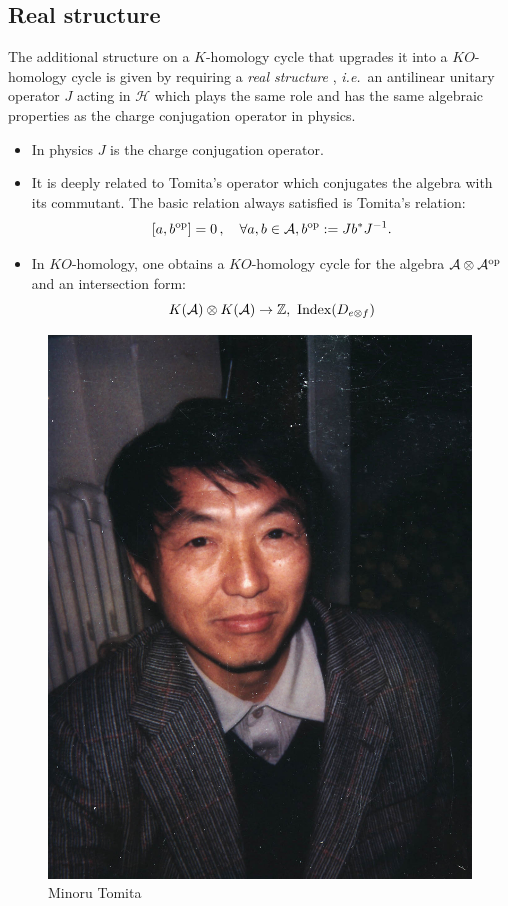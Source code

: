 \documentclass[12pt]{article}
\def\qqq{\,,\quad \forall}
\def\Z{{\mathbb Z}}
\def\cA{{\mathcal A}}
\def\cH{{\mathcal H}}
\newcommand{\ie}{{\it i.e.\/}\ }
\def\qqq{\,,\quad \forall}
\begin{document}
 \subsection{Real structure}\label{sectreal}
The
additional structure on a $K$-homology cycle that upgrades it into a $KO$-homology cycle  is given by requiring a {\em real structure} \cite{Coreal},
\ie an antilinear unitary operator $J$ acting in $\cH$ which plays the same
role and has the same algebraic properties  as the charge conjugation operator
in physics.
\begin{itemize}


\item In physics $J$ is the charge conjugation operator.

\item It is deeply related  to Tomita's operator which conjugates the algebra
with its commutant. The basic relation always satisfied is Tomita's relation:
$$
[a,b^{\rm op}]=0\qqq a,  b \in\mathcal{A}, b^{\rm op}:= Jb^*J^{-1}.
$$
\item In $KO$-homology, one obtains a $KO$-homology cycle for the algebra 
$\cA\otimes \cA^{\rm op}$
and an intersection form:
$$
K(\cA)\otimes K(\cA)\to \Z, \  {\rm Index}(D_{e\otimes f})
$$
\end{itemize}
\begin{figure}[H]
\begin{center}
\includegraphics[scale=0.6]{tomita.jpg}
\end{center}
\caption{Minoru Tomita \label{tomita} }
\end{figure}
\end{document}
